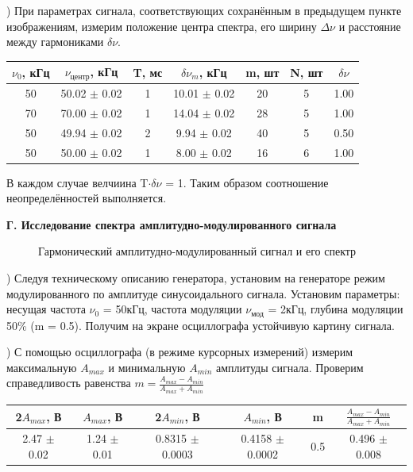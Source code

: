 \documentclass[a4paper,12pt]{article}
\begin{document}
) При параметрах сигнала, соответствующих сохранённым в предыдущем пункте изображениям, измерим положение центра спектра, его ширину $\Delta\nu$ и расстояние между гармониками $\delta\nu$.

\begin{center}
\begin{tabular}{|c|c|c|c|c|c|c|}
	\hline
	$\nu_0$, кГц & $\nu_{\text{центр}}$, кГц & T, мс & $\delta\nu_m$, кГц & m, шт & N, шт & $\delta\nu$ \\
	\hline
	50 & 50.02 $\pm$ 0.02 & 1 & 10.01 $\pm$ 0.02 & 20 & 5 & 1.00 \\
	\hline
	70 & 70.00 $\pm$ 0.02 & 1 & 14.04 $\pm$ 0.02 & 28 & 5 & 1.00  \\
	\hline
	50 & 49.94 $\pm$ 0.02 & 2 & 9.94 $\pm$ 0.02 & 40 & 5 & 0.50 \\
	\hline
	50 & 50.00 $\pm$ 0.02 & 1 & 8.00 $\pm$ 0.02 & 16 & 6 & 1.00 \\
	\hline
\end{tabular}
\end{center}

В каждом случае велчиина T$\cdot\delta\nu$ = 1. Таким образом соотношение неопределённостей выполняется. 

\textbf{Г. Исследование спектра амплитудно-модулированного сигнала}

\begin{figure}
\caption{Гармонический амплитудно-модулированный сигнал и его спектр}
\end{figure}

) Следуя техническому описанию генератора, установим на генераторе режим модулированного по амплитуде синусоидального сигнала. Установим параметры: несущая частота $\nu_0$ = 50кГц, частота модуляции $\nu_{\text{мод}}$ = 2кГц, глубина модуляции 50\% (m = 0.5). Получим на экране осциллографа устойчивую картину сигнала. 

) С помощью осциллографа (в режиме курсорных измерений) измерим максимальную $A_{max}$ и минимальную $A_{min}$ амплитуды сигнала. 
Проверим справедливость равенства $m = \frac{A_{max}-A_{min}}{A_{max}+A_{min}}$

\begin{center}
\begin{tabular}{|c|c|c|c|c|c|}
	\hline
	2$A_{max}$, В & $A_{max}$, В & 2$A_{min}$, В & $A_{min}$, В  & m & $\frac{A_{max}-A_{min}}{A_{max}+A_{min}}$ \\
	\hline
	2.47 $\pm$ 0.02 & 1.24 $\pm$ 0.01 & 0.8315 $\pm$ 0.0003 & 0.4158 $\pm$ 0.0002  & 0.5 & 0.496 $\pm$ 0.008 \\
	\hline
\end{tabular}
\end{center}
\end{document}
